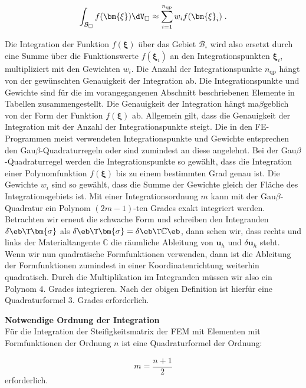 \begin{equation}
\int_{\mathcal{B}_{\square}} f(\bm{\xi}) \dV_{\square} \approx \sum_{i=1}^{n_{\text{qp}}} w_i f(\bm{\xi}_i) \; .
\end{equation}

Die Integration der Funktion $f(\bm{\xi})$ über das Gebiet $\mathcal{B}_{\square}$ wird also ersetzt durch eine Summe über die Funktionswerte $f(\bm{\xi}_i)$ an den Integrationspunkten $\bm{\xi}_i$, multipliziert mit den Gewichten $w_i$. Die Anzahl der Integrationspunkte $n_{\text{qp}}$ hängt von der gewünschten Genauigkeit der Integration ab. Die Integrationspunkte und Gewichte sind für die im vorangegangenen Abschnitt beschriebenen Elemente in Tabellen zusammengestellt. Die Genauigkeit der Integration hängt ma$\beta$geblich von der Form der Funktion $f(\bm{\xi})$ ab. Allgemein gilt, dass die Genauigkeit der Integration mit der Anzahl der Integrationspunkte steigt. Die in den FE-Programmen meist verwendeten Integrationspunkte und Gewichte entsprechen den Gau$\beta$-Quadraturregeln oder sind zumindest an diese angelehnt. Bei der Gau$\beta$-Quadraturregel werden die Integrationspunkte so gewählt, dass die Integration einer Polynomfunktion $f(\bm{\xi})$ bis zu einem bestimmten Grad genau ist. Die Gewichte $w_i$ sind so gewählt, dass die Summe der Gewichte gleich der Fläche des Integrationsgebiets ist. Mit einer Integrationsordnung $m$ kann mit der Gau$\beta$-Quadratur ein Polynom $(2m - 1)$-ten Grades exakt integriert werden. Betrachten wir erneut die schwache Form und schreiben den Integranden $\delta\eb\T  \bm{\sigma}$ als $\delta\eb\T  \bm{\sigma} = \delta\eb\T  \mathbb{C} \eb$, dann sehen wir, dass rechts und links der Materialtangente $\mathbb{C}$ die räumliche Ableitung von $\bm{u}_h$ und $\delta\bm{u}_h$ steht. Wenn wir nun quadratische Formfunktionen verwenden, dann ist die Ableitung der Formfunktionen zumindest in einer Koordinatenrichtung weiterhin quadratisch. Durch die Multiplikation im Integranden müssen wir also ein Polynom 4. Grades integrieren. Nach der obigen Definition ist hierfür eine Quadraturformel 3. Grades erforderlich.

\begin{framed}
\textbf{Notwendige Ordnung der Integration}\\
Für die Integration der Steifigkeitsmatrix der FEM mit Elementen mit Formfunktionen der Ordnung $n$ ist eine Quadraturformel der Ordnung:

\begin{equation*}
m = \frac{n+1}{2}
\end{equation*}
erforderlich.
\end{framed}

